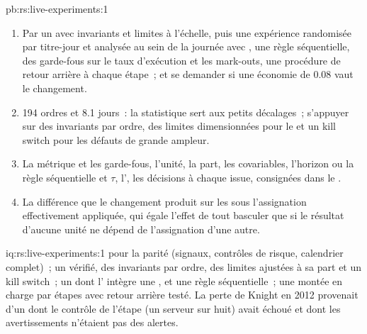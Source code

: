 \begin{solution}{pb:rs:live-experiments:1}
\begin{enumerate}
distinguable de zéro en deux années d'activité.
\item Par un  avec invariants et limites à l'échelle, puis une expérience randomisée par titre-jour et analysée au sein de la journée avec , une règle séquentielle,
des garde-fous sur le taux d'exécution et les mark-outs, une procédure de retour arrière à chaque étape~; et se demander si une économie de 0.08 vaut le changement.
\item 194 ordres et 8.1 jours~: la statistique sert aux petits décalages~; s'appuyer sur des invariants par ordre, des limites dimensionnées pour le  et un kill switch pour les défauts de grande ampleur.
\item La métrique et les garde-fous, l'unité, la part, les covariables, l'horizon ou la règle séquentielle et $\tau$, l', les décisions à
chaque issue, consignées dans le .
\item La différence que le changement produit sur les  sous l'assignation effectivement appliquée, qui égale l'effet de tout basculer que si
le résultat d'aucune unité ne dépend de l'assignation d'une autre.
\end{enumerate}
\end{solution}

\begin{solution}{iq:rs:live-experiments:1}
 pour la parité (signaux, contrôles de risque, calendrier complet)~; un  vérifié, des invariants par ordre, des limites ajustées à sa part et un
kill switch~; un  dont l' intègre une ,  et une règle séquentielle~; une montée en charge par étapes avec retour arrière testé. La perte de Knight
en 2012 provenait d'un  dont le contrôle de l'étape (un serveur sur huit) avait échoué et dont les avertissements n'étaient pas des alertes.
\end{solution}

